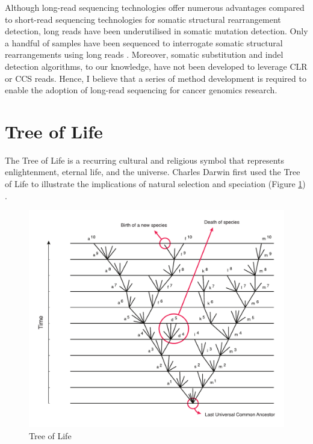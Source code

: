 Although long-read sequencing technologies offer numerous advantages compared to short-read sequencing technologies for somatic structural rearrangement detection, long reads have been underutilised in somatic mutation detection. Only a handful of samples have been sequenced to interrogate somatic structural rearrangements using long reads \cite{Nattestad2018-tr, Sakamoto2020-nq, Fujimoto2021-kc}. Moreover, somatic substitution and indel detection algorithms, to our knowledge, have not been developed to leverage CLR or CCS reads. Hence, I believe that a series of method development is required to enable the adoption of long-read sequencing for cancer genomics research. 

\section{Tree of Life}

The Tree of Life is a recurring cultural and religious symbol that represents enlightenment, eternal life, and the universe. Charles Darwin first used the Tree of Life to illustrate the implications of natural selection and speciation (Figure \ref{figure:tree-of-life}) \cite{Darwin1859}. 

\begin{figure}[htbp!]
\caption{Tree of Life}
\label{figure:tree-of-life}
\begin{centering}
\includegraphics[width=\textwidth]{Vector/tree_of_life.pdf}
\end{centering}
\end{figure}

